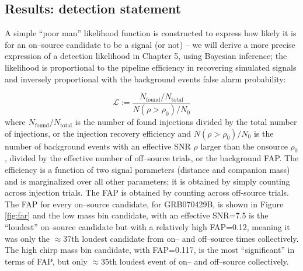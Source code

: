 \subsection{Results: detection statement}
A simple ``poor man'' likelihood function is constructed to express how likely it is for an on--source candidate to be a signal (or not) -- we will derive a more precise expression of a detection likelihood in Chapter 5, using Bayesian inference; the likelihood is proportional to the pipeline efficiency in recovering simulated signals and inversely proportional with the background events false alarm probability:

\begin{equation}
\mathcal{L} := \frac{N_{\mathrm{found}}/N_{\mathrm{total}}}{N(\rho>\rho_0)/N_0}
\label{coinklike}
\end{equation}
%
where $N_{\mathrm{found}}/N_{\mathrm{total}}$ is the number of found injections divided by the total number of injections, or the injection recovery efficiency and $N(\rho>\rho_0)/N_0$ is the number of background events with an effective SNR $\rho$ larger than the onsource $\rho_0$, divided by the effective number of off--source trials, or the background FAP. The efficiency is a function of two signal parameters (distance and companion mass) and is marginalized over all other parameters; it is obtained by simply counting across injection trials. The FAP is obtained by counting across off-source trials. The FAP for every on--source candidate, for GRB070429B, is shown in Figure \ref{fig:far} and the low mass bin candidate, with an effective SNR=7.5 is the ``loudest'' on--source candidate but with a relatively high FAP=0.12, meaning it was only the $\approx$37th loudest candidate from on-- and off--source times collectively. The high chirp mass bin candidate, with FAP=0.117, is the most ``significant'' in terms of FAP, but only $\approx$35th loudest event of on-- and off--source collectively.

